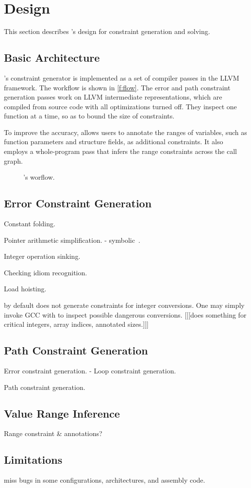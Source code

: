 \section{Design}
\label{s:gen}

This section describes \sys's design for constraint generation and
solving.

\subsection{Basic Architecture}

\sys's constraint generator is implemented as a set of compiler
passes in the LLVM~\cite{lattner:llvm} framework.  The workflow is
shown in \autoref{f:flow}.  The error and path constraint generation
passes work on LLVM intermediate representations, which are compiled
from source code with all optimizations turned off.  They inspect
one function at a time, so as to bound the size of constraints.

To improve the accuracy, \sys allows users to annotate the ranges
of variables, such as function parameters and structure fields, as
additional constraints. It also employs a whole-program pass that
infers the range constraints across the call graph.

\begin{figure}
\centering
\resizebox{0.9\linewidth}{!}{

}
\caption{\sys's worflow.}
\label{f:flow}
\end{figure}

\subsection{Error Constraint Generation}


Constant folding.

Pointer arithmetic simplification.
- symbolic~\cite{engelen:symbolic}.

Integer operation sinking.

Checking idiom recognition.

Load hoisting.

\sys by default does not generate constraints for integer conversions.
One may simply invoke GCC with  to inspect possible
dangerous conversions.
[[[\sys does something for critical integers, array indices, annotated sizes.]]]

\subsection{Path Constraint Generation}

Error constraint generation.
- Loop constraint generation.

Path constraint generation.

\subsection{Value Range Inference}

Range constraint \& annotations?

\subsection{Limitations}

miss bugs in some configurations, architectures,
and assembly code.
